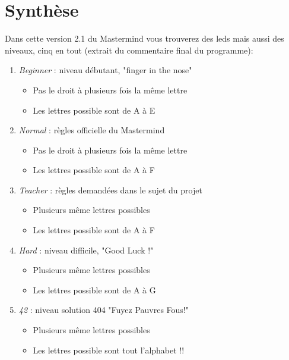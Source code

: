 \chapter{Synthèse}

Dans cette version 2.1 du Mastermind vous trouverez des leds mais aussi des niveaux, cinq en tout (extrait du commentaire final du programme):
\begin{enumerate}
\item \emph{Beginner} : niveau débutant, "finger in the nose"
	\begin{itemize}
      \item Pas le droit à plusieurs fois la même lettre
      \item Les lettres possible sont de A à E
	\end{itemize}
    
\item \emph{Normal} : règles officielle du Mastermind
	\begin{itemize}
      \item Pas le droit à plusieurs fois la même lettre
      \item Les lettres possible sont de A à F
	\end{itemize}
    
\item \emph{Teacher} : règles demandées dans le sujet du projet
	\begin{itemize}
      \item Plusieurs même lettres possibles
      \item Les lettres possible sont de A à F
	\end{itemize}
    
\item \emph{Hard} : niveau difficile, "Good Luck !"
	\begin{itemize}
      \item Plusieurs même lettres possibles
      \item Les lettres possible sont de A à G
	\end{itemize}
    
\item \emph{42} : niveau solution 404 "Fuyez Pauvres Fous!"
	\begin{itemize}
      \item Plusieurs même lettres possibles
      \item Les lettres possible sont tout l'alphabet !!
	\end{itemize}
\end{enumerate}

